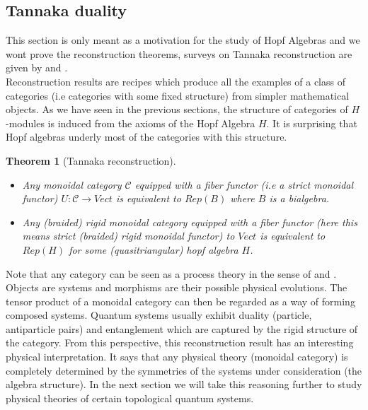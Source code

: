 \documentclass{article}
\newtheorem{theorem}{Theorem}
\newcommand{\cat}{\mathcal{C}}
\begin{document}
\subsection{Tannaka duality}
This section is only meant as a motivation for the study of Hopf Algebras and we wont prove the reconstruction theorems, surveys on Tannaka reconstruction are given by \cite{Vercruysse12} and \cite{Joyal91}.\\
Reconstruction results are recipes which produce all the examples of a class of categories (i.e categories with some fixed structure) from simpler mathematical objects. As we have seen in the previous sections, the structure of categories of $H$-modules is induced from the axioms of the Hopf Algebra $H$. It is surprising that Hopf algebras underly most of the categories with this structure.
\begin{theorem}[Tannaka reconstruction]
	\begin{itemize}
		\item Any monoidal category $\cat$ equipped with a fiber functor (i.e a strict monoidal functor) $U: \cat \rightarrow Vect$ is equivalent to $Rep(B)$ where $B$ is a bialgebra.
		\item Any (braided) rigid monoidal category equipped with a fiber functor (here this means strict (braided) rigid monoidal functor) to $Vect$ is equivalent to $Rep(H)$ for some (quasitriangular) hopf algebra $H$.
	\end{itemize}
\end{theorem}
Note that any category can be seen as a process theory in the sense of \cite{Abramsky04} and \cite{Coecke17}. Objects are systems and morphisms are their possible physical evolutions. The tensor product of a monoidal category can then be regarded as a way of forming composed systems. Quantum systems usually exhibit duality (particle, antiparticle pairs) and entanglement which are captured by the rigid structure of the category. From this perspective, this reconstruction result has an interesting physical interpretation. It says that any physical theory (monoidal category) is completely determined by the symmetries of the systems under consideration (the algebra structure). In the next section we will take this reasoning further to study physical theories of certain topological quantum systems.
\end{document}

